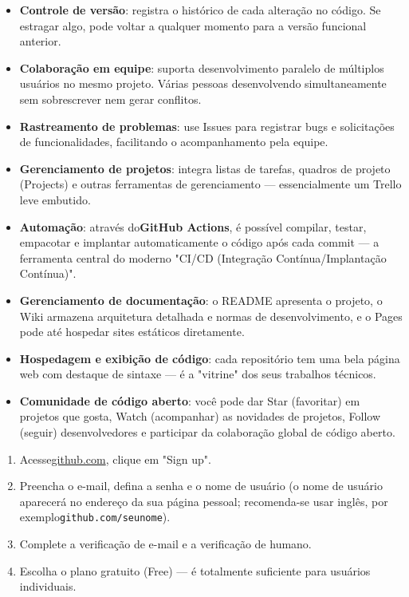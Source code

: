 \begin{itemize}
  \item \textbf{Controle de versão}: registra o histórico de cada alteração no código. Se estragar algo, pode voltar a qualquer momento para a versão funcional anterior.
  \item \textbf{Colaboração em equipe}: suporta desenvolvimento paralelo de múltiplos usuários no mesmo projeto. Várias pessoas desenvolvendo simultaneamente sem sobrescrever nem gerar conflitos.
  \item \textbf{Rastreamento de problemas}: use Issues para registrar bugs e solicitações de funcionalidades, facilitando o acompanhamento pela equipe.
  \item \textbf{Gerenciamento de projetos}: integra listas de tarefas, quadros de projeto (Projects) e outras ferramentas de gerenciamento — essencialmente um Trello leve embutido.
  \item \textbf{Automação}: através do\textbf{GitHub Actions}, é possível compilar, testar, empacotar e implantar automaticamente o código após cada commit — a ferramenta central do moderno "CI/CD (Integração Contínua/Implantação Contínua)".
  \item \textbf{Gerenciamento de documentação}: o README apresenta o projeto, o Wiki armazena arquitetura detalhada e normas de desenvolvimento, e o Pages pode até hospedar sites estáticos diretamente.
  \item \textbf{Hospedagem e exibição de código}: cada repositório tem uma bela página web com destaque de sintaxe — é a "vitrine" dos seus trabalhos técnicos.
  \item \textbf{Comunidade de código aberto}: você pode dar Star (favoritar) em projetos que gosta, Watch (acompanhar) as novidades de projetos, Follow (seguir) desenvolvedores e participar da colaboração global de código aberto.
\end{itemize}



\begin{enumerate}
  \item Acesse\href{https://github.com}{github.com}, clique em "Sign up".
  \item Preencha o e-mail, defina a senha e o nome de usuário (o nome de usuário aparecerá no endereço da sua página pessoal; recomenda-se usar inglês, por exemplo\texttt{github.\allowbreak com/\allowbreak seunome}).
  \item Complete a verificação de e-mail e a verificação de humano.
  \item Escolha o plano gratuito (Free) — é totalmente suficiente para usuários individuais.
\end{enumerate}

